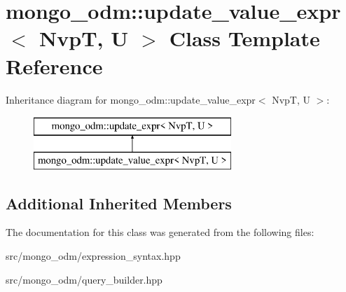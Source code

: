 \hypertarget{classmongo__odm_1_1update__value__expr}{}\section{mongo\+\_\+odm\+:\+:update\+\_\+value\+\_\+expr$<$ NvpT, U $>$ Class Template Reference}
\label{classmongo__odm_1_1update__value__expr}
Inheritance diagram for mongo\+\_\+odm\+:\+:update\+\_\+value\+\_\+expr$<$ NvpT, U $>$\+:\begin{figure}[H]
\begin{center}
\leavevmode
\includegraphics[height=2.000000cm]{classmongo__odm_1_1update__value__expr}
\end{center}
\end{figure}
\subsection*{Additional Inherited Members}


The documentation for this class was generated from the following files\+:\begin{DoxyCompactItemize}
\item 
src/mongo\+\_\+odm/expression\+\_\+syntax.\+hpp\item 
src/mongo\+\_\+odm/query\+\_\+builder.\+hpp\end{DoxyCompactItemize}
